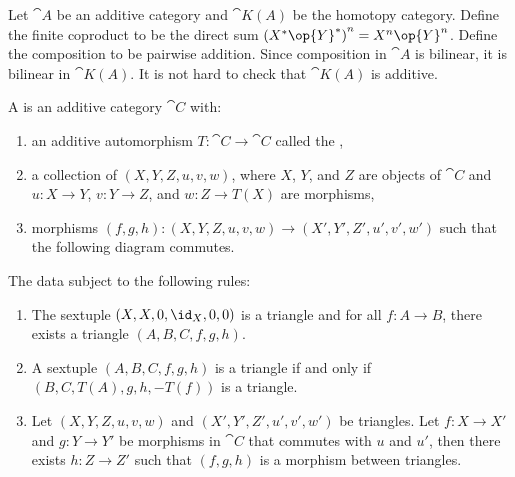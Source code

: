 \par
Let $\cat{A}$ be an additive category and $\cat{K(A)}$ be the homotopy category. Define the finite coproduct to be the direct sum ${({X}^{*}\op{Y}^{*})}^{n}={X}^{n}\op{Y}^{n}$. Define the composition to be pairwise addition. Since composition in $\cat{A}$ is bilinear, it is bilinear in $\cat{K(A)}$. It is not hard to check that $\cat{K(A)}$ is additive.
\begin{definition}
    A  is an additive category $\cat{C}$ with:
    \begin{enumerate}
        \item an additive automorphism $T:\cat{C}\to\cat{C}$ called the ,
        \item a collection of  $(X,Y,Z,u,v,w)$, where $X$, $Y$, and $Z$ are objects of $\cat{C}$ and $u:X\to Y$, $v:Y\to Z$, and $w:Z\to T(X)$ are morphisms,
        \item morphisms $(f,g,h):(X,Y,Z,u,v,w)\to(X',Y',Z',u',v',w')$ such that the following diagram commutes.
    \end{enumerate}
    \begin{center}
    \end{center}
    The data subject to the following rules:
    \begin{enumerate}
        \item The sextuple $(X,X,0,{\id}_{X},0,0)$ is a triangle and for all $f:A\to B$, there exists a triangle $(A,B,C,f,g,h)$.
        \item A sextuple $(A,B,C,f,g,h)$ is a triangle if and only if $(B,C,T(A),g,h,-T(f))$ is a triangle.
        \item Let $(X,Y,Z,u,v,w)$ and $(X',Y',Z',u',v',w')$ be triangles. Let $f:X\to X'$ and $g:Y\to Y'$ be morphisms in $\cat{C}$ that commutes with $u$ and $u'$, then there exists $h:Z\to Z'$ such that $(f,g,h)$ is a morphism between triangles.

\end{enumerate}
\end{definition}
